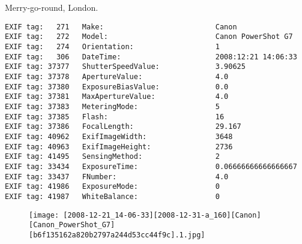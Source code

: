 \section{\protect{}}
\noindent Merry-go-round, London.
\noindent
\begin{lstlisting}
EXIF tag:   271   Make:                          Canon
EXIF tag:   272   Model:                         Canon PowerShot G7
EXIF tag:   274   Orientation:                   1
EXIF tag:   306   DateTime:                      2008:12:21 14:06:33
EXIF tag: 37377   ShutterSpeedValue:             3.90625
EXIF tag: 37378   ApertureValue:                 4.0
EXIF tag: 37380   ExposureBiasValue:             0.0
EXIF tag: 37381   MaxApertureValue:              4.0
EXIF tag: 37383   MeteringMode:                  5
EXIF tag: 37385   Flash:                         16
EXIF tag: 37386   FocalLength:                   29.167
EXIF tag: 40962   ExifImageWidth:                3648
EXIF tag: 40963   ExifImageHeight:               2736
EXIF tag: 41495   SensingMethod:                 2
EXIF tag: 33434   ExposureTime:                  0.06666666666666667
EXIF tag: 33437   FNumber:                       4.0
EXIF tag: 41986   ExposureMode:                  0
EXIF tag: 41987   WhiteBalance:                  0

\end{lstlisting}
\clearpage
\begin{figure}
\raggedleft
\texttt{[image: [2008-12-21\_14-06-33][2008-12-31-a\_160][Canon][Canon\_PowerShot\_G7][b6f135162a820b2797a244d53cc44f9c].1.jpg]}
\end{figure}


\clearpage
